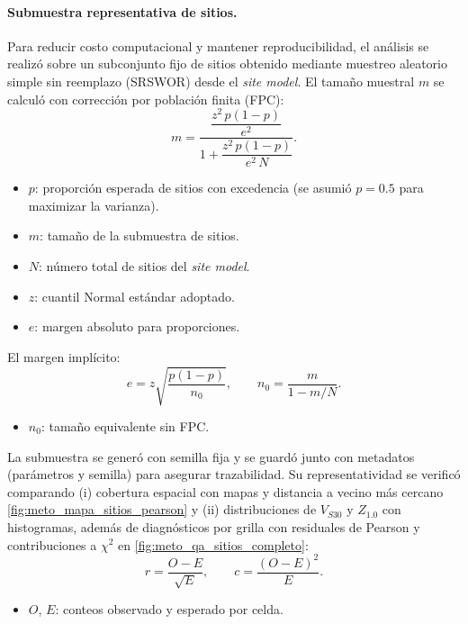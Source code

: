 \paragraph{Submuestra representativa de sitios.}
Para reducir costo computacional y mantener reproducibilidad, el análisis se realizó sobre un subconjunto fijo de sitios obtenido mediante muestreo aleatorio simple sin reemplazo (SRSWOR) desde el \textit{site model}. El tamaño muestral $m$ se calculó con corrección por población finita (FPC):
\begin{equation}
m=\frac{\dfrac{z^2\,p(1-p)}{e^2}}{1+\dfrac{z^2\,p(1-p)}{e^2\,N}}.
\label{eq:ns_fpc_m}
\end{equation}
\begin{itemize}
  \item $p$: proporción esperada de sitios con excedencia (se asumió $p=0.5$ para maximizar la varianza).	
  \item $m$: tamaño de la submuestra de sitios.
  \item $N$: número total de sitios del \textit{site model}.
  \item $z$: cuantil Normal estándar adoptado.
  \item $e$: margen absoluto para proporciones.
\end{itemize}

El margen implícito:
\begin{equation}
e=z\sqrt{\frac{p(1-p)}{n_0}},\qquad n_0=\frac{m}{1-m/N}.
\label{eq:ns_fpc_e}
\end{equation}
\begin{itemize}
  \item $n_0$: tamaño equivalente sin FPC.
\end{itemize}

La submuestra se generó con semilla fija y se guardó junto con metadatos (parámetros y semilla) para asegurar trazabilidad. Su representatividad se verificó comparando (i) cobertura espacial con mapas y distancia a vecino más cercano \ref{fig:meto_mapa_sitios_pearson} y (ii) distribuciones de $V_{S30}$ y $Z_{1.0}$ con histogramas, además de diagnósticos por grilla con residuales de Pearson y contribuciones a $\chi^2$ en \ref{fig:meto_qa_sitios_completo}:
\begin{equation}
r=\frac{O-E}{\sqrt{E}}, \qquad c=\frac{(O-E)^2}{E}.
\label{eq:qa_residuales}
\end{equation}
\begin{itemize}
  \item $O$, $E$: conteos observado y esperado por celda.
\end{itemize}

